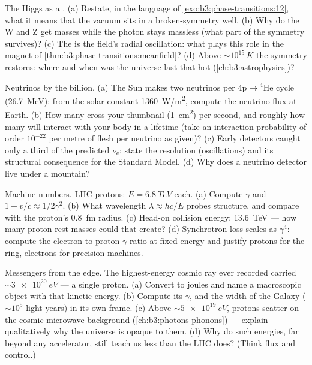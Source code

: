 \begin{exercise}[$\star\star\star$]\label{exo:b3:particle-physics:9}
The Higgs as a . (a) Restate, in the language of
\cref{exo:b3:phase-transitions:12}, what it means that the
vacuum sits in a broken-symmetry well. (b) Why do the W and Z
get masses while the photon stays massless (what part of the
symmetry survives)? (c) The  is the field's radial
oscillation: what plays this role in the magnet of
\cref{thm:b3:phase-transitions:meanfield}? (d) Above
$\sim10^{15}\,\unit{K}$ the symmetry restores: where and when
was the universe last that hot (\cref{ch:b3:astrophysics})?
\end{exercise}

\begin{exercise}[$\star\star\star$]\label{exo:b3:particle-physics:10}
Neutrinos by the billion. (a) The Sun makes two neutrinos per
$4\text{p} \to {}^4\text{He}$ cycle (\qty{26.7}{MeV}): from the
solar constant \qty{1360}{W/m^2}, compute the neutrino flux at
Earth. (b) How many cross your thumbnail
(\qty{1}{cm^2}) per second, and roughly how many will interact
with your body in a lifetime (take an interaction
probability of order $10^{-22}$ per metre of flesh per neutrino as
given)? (c) Early
detectors caught only a third of the predicted
$\nu_{\text{e}}$: state the resolution (oscillations) and its
structural consequence for the Standard Model. (d) Why does a
neutrino detector live under a mountain?
\end{exercise}

\begin{exercise}[$\star\star\star$]\label{exo:b3:particle-physics:11}
Machine numbers. LHC protons: $E = \qty{6.8}{TeV}$ each. (a)
Compute $\gamma$ and $1 - v/c \approx 1/2\gamma^2$. (b) What
wavelength $\lambda \approx hc/E$ probes structure, and compare
with the proton's \qty{0.8}{fm} radius. (c) Head-on collision
energy: \qty{13.6}{TeV} --- how many proton rest masses could
that create? (d) Synchrotron loss scales as $\gamma^4$:
compute the electron-to-proton $\gamma$ ratio at fixed energy
and justify protons for the ring, electrons for precision
machines.
\end{exercise}

\begin{exercise}[$\star\star\star$]\label{exo:b3:particle-physics:12}
Messengers from the edge. The highest-energy cosmic ray ever
recorded carried $\sim\qty{3e20}{eV}$ --- a single proton. (a)
Convert to joules and name a macroscopic object with that
kinetic energy. (b) Compute its $\gamma$, and the width of the
Galaxy ($\sim10^{5}$ light-years) in its own frame. (c) Above
$\sim\qty{5e19}{eV}$, protons scatter on the cosmic microwave
background (\cref{ch:b3:photons-phonons}) --- explain
qualitatively why the universe is opaque to them. (d) Why do
such energies, far beyond any accelerator, still teach us less
than the LHC does? (Think flux and control.)
\end{exercise}

